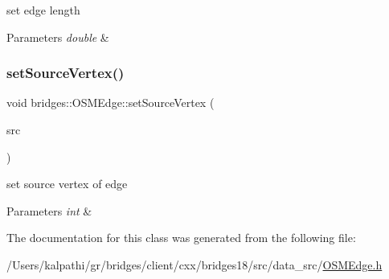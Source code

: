 set edge length


\begin{DoxyParams}{Parameters}
{\em double} & \\
\hline
\end{DoxyParams}
\mbox{\label{classbridges_1_1_o_s_m_edge_a32f40057bf1f58a4778e346b27143e8e}} 
\subsubsection{\texorpdfstring{set\+Source\+Vertex()}{setSourceVertex()}}
{\footnotesize\ttfamily void bridges\+::\+O\+S\+M\+Edge\+::set\+Source\+Vertex (\begin{DoxyParamCaption}\item[{int}]{src }\end{DoxyParamCaption})\hspace{0.3cm}{\ttfamily [inline]}}

set source vertex of edge


\begin{DoxyParams}{Parameters}
{\em int} & \\
\hline
\end{DoxyParams}


The documentation for this class was generated from the following file\+:\begin{DoxyCompactItemize}
\item 
/\+Users/kalpathi/gr/bridges/client/cxx/bridges18/src/data\+\_\+src/\mbox{\hyperlink{_o_s_m_edge_8h}{O\+S\+M\+Edge.\+h}}\end{DoxyCompactItemize}
